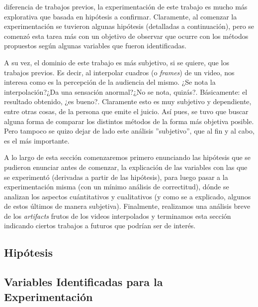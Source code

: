  diferencia de trabajos previos, la experimentaci\'on de este
trabajo es mucho m\'as explorativa que basada en hip\'otesis a confirmar.
Claramente, al comenzar la experimentaci\'on se tuvieron algunas hip\'otesis
(detalladas a continuaci\'on), pero se comenz\'o esta tarea m\'as con un
objetivo de observar que ocurre con los m\'etodos propuestos seg\'un algunas
variables que fueron identificadas.

\par A su vez, el dominio de este trabajo es m\'as subjetivo, si se quiere, que
los trabajos previos. Es decir, al interpolar cuadros (o \emph{frames}) de un
video, nos interesa como es la percepci\'on de la audiencia del mismo. ¿Se nota
la interpolaci\'on?¿Da una sensaci\'on anormal?¿No se nota, quiz\'as?.
B\'asicamente: el resultado obtenido, ¿es bueno?. Claramente esto es muy
subjetivo y dependiente, entre otras cosas, de la persona que emite el juicio.
As\'i pues, se tuvo que buscar alguna forma de comparar los distintos m\'etodos
de la forma m\'as objetiva posible. Pero tampoco se quizo dejar de lado este
an\'alisis ''subjetivo'', que al fin y al cabo, es el m\'as importante.

\par A lo largo de esta secci\'on comenzaremos primero enunciando las
hip\'otesis que se pudieron enunciar antes de comenzar, la explicaci\'on de las
variables con las que se experiment\'o (derivadas a partir de las hip\'otesis),
para luego pasar a la experimentaci\'on misma (con un m\'inimo an\'alisis de
correctitud), d\'onde se analizan los aspectos cu\'antitativos y cualitativos
(y como se a explicado, algunos de estos \'ultimos de manera subjetiva).
Finalmente, realizamos una an\'alisis breve de los \emph{artifacts} frutos de
los videos interpolados y terminamos esta secci\'on indicando ciertos trabajos
a futuros que podr\'ian ser de inter\'es.

\subsection{Hip\'otesis}


\subsection{Variables Identificadas para la Experimentaci\'on}



